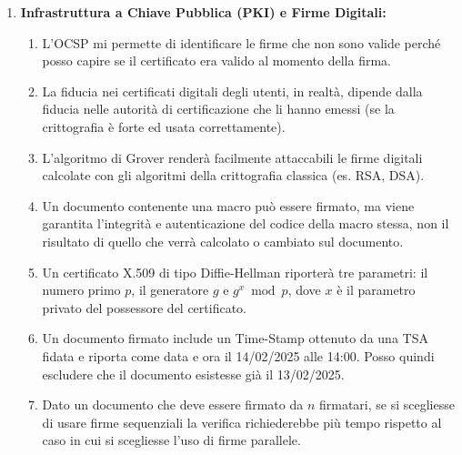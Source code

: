 \documentclass[11pt,a4paper]{article}
\begin{document}
\begin{questionbox}
\begin{enumerate}[label=\textbf{1.\arabic*}]
    \item \textbf{Infrastruttura a Chiave Pubblica (PKI) e Firme Digitali:}
    \begin{enumerate}[label=\alph*.]
        \item L'OCSP mi permette di identificare le firme che non sono valide perch\'e posso capire se il certificato era valido al momento della firma.
        \item La fiducia nei certificati digitali degli utenti, in realt\`a, dipende dalla fiducia nelle autorit\`a di certificazione che li hanno emessi (se la crittografia \`e forte ed usata correttamente).
        \item L'algoritmo di Grover render\`a facilmente attaccabili le firme digitali calcolate con gli algoritmi della crittografia classica (es. RSA, DSA).
        \item Un documento contenente una macro pu\`o essere firmato, ma viene garantita l'integrit\`a e autenticazione del codice della macro stessa, non il risultato di quello che verr\`a calcolato o cambiato sul documento.
        \item Un certificato X.509 di tipo Diffie-Hellman riporter\`a tre parametri: il numero primo $p$, il generatore $g$ e $g^x \bmod p$, dove $x$ \`e il parametro privato del possessore del certificato.
        \item Un documento firmato include un Time-Stamp ottenuto da una TSA fidata e riporta come data e ora il 14/02/2025 alle 14:00. Posso quindi escludere che il documento esistesse gi\`a il 13/02/2025.
        \item Dato un documento che deve essere firmato da $n$ firmatari, se si scegliesse di usare firme sequenziali la verifica richiederebbe pi\`u tempo rispetto al caso in cui si scegliesse l'uso di firme parallele.
    \end{enumerate}


\end{enumerate}
\end{questionbox}
\end{document}
